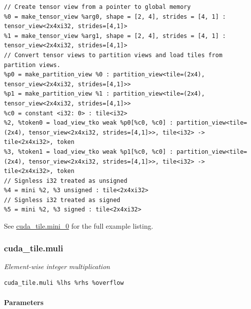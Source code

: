 \documentclass{article}
\begin{document}
\begin{itemize}
\begin{lstlisting}
// Create tensor view from a pointer to global memory
%0 = make_tensor_view %arg0, shape = [2, 4], strides = [4, 1] : tensor_view<2x4xi32, strides=[4,1]>
%1 = make_tensor_view %arg1, shape = [2, 4], strides = [4, 1] : tensor_view<2x4xi32, strides=[4,1]>
// Convert tensor views to partition views and load tiles from partition views.
%p0 = make_partition_view %0 : partition_view<tile=(2x4), tensor_view<2x4xi32, strides=[4,1]>>
%p1 = make_partition_view %1 : partition_view<tile=(2x4), tensor_view<2x4xi32, strides=[4,1]>>
%c0 = constant <i32: 0> : tile<i32>
%2, %token0 = load_view_tko weak %p0[%c0, %c0] : partition_view<tile=(2x4), tensor_view<2x4xi32, strides=[4,1]>>, tile<i32> -> tile<2x4xi32>, token
%3, %token1 = load_view_tko weak %p1[%c0, %c0] : partition_view<tile=(2x4), tensor_view<2x4xi32, strides=[4,1]>>, tile<i32> -> tile<2x4xi32>, token
// Signless i32 treated as unsigned
%4 = mini %2, %3 unsigned : tile<2x4xi32>
// Signless i32 treated as signed
%5 = mini %2, %3 signed : tile<2x4xi32>
\end{lstlisting}

\end{itemize}
See \href{https://docs.nvidia.com/cuda/tile-ir/latest/sections/appendix.html#example-cuda-tile-mini-0}{cuda\_tile.mini\_0} for the full example listing.



\subsubsection{cuda\_tile.muli}

\textit{Element-wise integer multiplication}


\begin{lstlisting}
cuda_tile.muli %lhs %rhs %overflow
\end{lstlisting}

\paragraph{Parameters}
\end{document}
